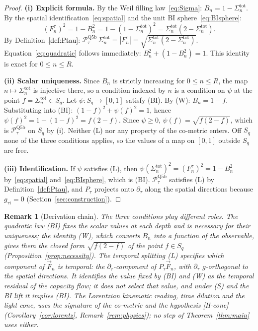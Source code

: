 \documentclass[11pt,a4paper]{article}
\newtheorem{remark}[theorem]{Remark}
\begin{document}
      \begin{proof}
        \textbf{(i) Explicit formula.}
        By the Weil filling law~\eqref{eq:Sigma}: $B_n = 1 - \Sigma_n^{\mathrm{tot}}$.
        By the spatial identification~\eqref{eq:spatial} and the unit BI sphere~\eqref{eq:BIsphere}:
        \[
          (F_n^\tau)^2 = 1 - B_n^2 = 1 - (1-\Sigma_n^{\mathrm{tot}})^2
          = \Sigma_n^{\mathrm{tot}}(2 - \Sigma_n^{\mathrm{tot}}).
        \]
        By Definition~\ref{def:Ptau}: $\mathcal{P}_\tau^{\mathrm{Q5b}}\,\Sigma_n^{\mathrm{tot}}
        = |F_n^\tau| = \sqrt{\Sigma_n^{\mathrm{tot}}(2-\Sigma_n^{\mathrm{tot}})}$.
        Equation~\eqref{eq:quadratic} follows immediately: $B_n^2 + (1-B_n^2) = 1$.
        This identity is exact for $0 \le n \le R$.

        \textbf{(ii) Scalar uniqueness.}
        Since $B_n$ is strictly increasing for $0 \le n \le R$, the map $n \mapsto \Sigma_n^{\mathrm{tot}}$ is
        injective there, so a condition indexed by $n$ is a condition on $\psi$ at the point
        $f = \Sigma_n^{\mathrm{tot}} \in S_q$.
        Let $\psi\colon S_q \to [0,1]$ satisfy (BI).
        By (W): $B_n = 1 - f$.
        Substituting into (BI): $(1-f)^2 + \psi(f)^2 = 1$, hence
        $\psi(f)^2 = 1 - (1-f)^2 = f(2-f)$.
        Since $\psi \ge 0$, $\psi(f) = \sqrt{f(2-f)}$, which is $\mathcal{P}_\tau^{\mathrm{Q5b}}$ on $S_q$ by (i).
        Neither (L) nor any property of the co-metric enters.
        Off $S_q$ none of the three conditions applies, so the values of a map on $[0,1]$ outside $S_q$ are free.

        \textbf{(iii) Identification.}
        If $\psi$ satisfies (L), then $\psi(\Sigma_n^{\mathrm{tot}})^2 = (F_n^\tau)^2 = 1 - B_n^2$ by~\eqref{eq:spatial}
        and~\eqref{eq:BIsphere}, which is (BI).
        $\mathcal{P}_\tau^{\mathrm{Q5b}}$ satisfies (L) by Definition~\ref{def:Ptau}, and $P_\tau$ projects onto
        $\partial_\tau$ along the spatial directions because $g_{\tau i} = 0$ (Section~\ref{sec:construction}).
      \end{proof}

      \begin{remark}[Derivation chain]\label{rem:chain}
        The three conditions play different roles.
        The quadratic law (BI) fixes the scalar values at each depth and is necessary for their uniqueness; the
        identity (W), which converts $B_n$ into a function of the observable, gives them the closed form
        $\sqrt{f(2-f)}$ of the point $f \in S_q$ (Proposition~\ref{prop:necessity}).
        The temporal splitting (L) specifies \emph{which} component of $\vec{F}_n$ is temporal: the
        $\partial_\tau$-component of $P_\tau\vec{F}_n$, with $\partial_\tau$ $g$-orthogonal to the spatial directions.
        It identifies the value fixed by (BI) and (W) as the temporal residual of the capacity flow; it does not
        select that value, and under (S) and the BI lift it implies (BI).
        The Lorentzian kinematic reading, time dilation and the light cone, uses the signature of the co-metric and
        the hypothesis [H-cone] (Corollary~\ref{cor:lorentz}, Remark~\ref{rem:physics}); no step of
        Theorem~\ref{thm:main} uses either.
      \end{remark}
\end{document}
